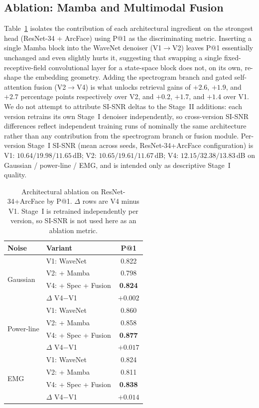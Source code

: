 \documentclass{IEEEtran}
\begin{document}
\subsection{Ablation: Mamba and Multimodal Fusion}
Table~\ref{tab:ablation} isolates the contribution of each architectural
ingredient on the strongest head (ResNet-34 + ArcFace) using P@1 as the
discriminating metric. Inserting a single Mamba block into the WaveNet
denoiser (V1$\to$V2) leaves P@1 essentially unchanged and even slightly
hurts it, suggesting that swapping a single fixed-receptive-field
convolutional layer for a state-space block does not, on its own,
re-shape the embedding geometry. Adding the spectrogram branch and gated
self-attention fusion (V2$\to$V4) is what unlocks retrieval gains of
$+2.6$, $+1.9$, and $+2.7$ percentage points respectively over V2, and
$+0.2$, $+1.7$, and $+1.4$ over V1. We do not attempt to attribute
SI-SNR deltas to the Stage~II additions: each version retrains its own
Stage~I denoiser independently, so cross-version SI-SNR differences
reflect independent training runs of nominally the same architecture
rather than any contribution from the spectrogram branch or fusion
module. Per-version Stage~I SI-SNR (mean across seeds, ResNet-34+ArcFace
configuration) is V1: $10.64/19.98/11.65$\,dB; V2:
$10.65/19.61/11.67$\,dB; V4: $12.15/32.38/13.83$\,dB on Gaussian /
power-line / EMG, and is intended only as descriptive Stage~I quality.

\begin{table}[t]
\centering
\caption{Architectural ablation on ResNet-34+ArcFace by P@1.
$\Delta$ rows are V4 minus V1. Stage~I is retrained independently per
version, so SI-SNR is not used here as an ablation metric.}
\label{tab:ablation}
\begin{tabular}{l l c}
\toprule
\textbf{Noise} & \textbf{Variant} & \textbf{P@1} \\
\midrule
\multirow{4}{*}{Gaussian}
 & V1: WaveNet  & 0.822 \\
 & V2: + Mamba  & 0.798 \\
 & V4: + Spec + Fusion & \textbf{0.824} \\
 & $\Delta$ V4$-$V1 & $+0.002$ \\
\midrule
\multirow{4}{*}{Power-line}
 & V1: WaveNet  & 0.860 \\
 & V2: + Mamba  & 0.858 \\
 & V4: + Spec + Fusion & \textbf{0.877} \\
 & $\Delta$ V4$-$V1 & $+0.017$ \\
\midrule
\multirow{4}{*}{EMG}
 & V1: WaveNet  & 0.824 \\
 & V2: + Mamba  & 0.811 \\
 & V4: + Spec + Fusion & \textbf{0.838} \\
 & $\Delta$ V4$-$V1 & $+0.014$ \\
\bottomrule
\end{tabular}
\end{table}
\end{document}
